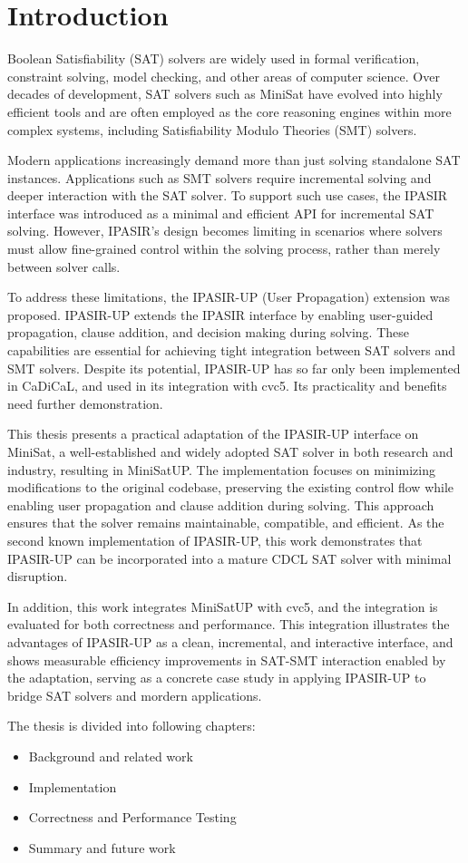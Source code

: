 \chapter{Introduction}

Boolean Satisfiability (SAT) solvers are widely used in formal verification, constraint solving, model checking, and other areas of computer science. Over decades of development, SAT solvers such as MiniSat have evolved into highly efficient tools and are often employed as the core reasoning engines within more complex systems, including Satisfiability Modulo Theories (SMT) solvers.

Modern applications increasingly demand more than just solving standalone SAT instances. Applications such as SMT solvers require incremental solving and deeper interaction with the SAT solver. To support such use cases, the IPASIR interface was introduced as a minimal and efficient API for incremental SAT solving. However, IPASIR's design becomes limiting in scenarios where solvers must allow fine-grained control within the solving process, rather than merely between solver calls.

To address these limitations, the IPASIR-UP (User Propagation) extension was proposed. IPASIR-UP extends the IPASIR interface by enabling user-guided propagation, clause addition, and decision making during solving. These capabilities are essential for achieving tight integration between SAT solvers and SMT solvers. Despite its potential, IPASIR-UP has so far only been implemented in CaDiCaL, and used in its integration with cvc5. Its practicality and benefits need further demonstration.

This thesis presents a practical adaptation of the IPASIR-UP interface on MiniSat, a well-established and widely adopted SAT solver in both research and industry, resulting in MiniSatUP. The implementation focuses on minimizing modifications to the original codebase, preserving the existing control flow while enabling user propagation and clause addition during solving. This approach ensures that the solver remains maintainable, compatible, and efficient. As the second known implementation of IPASIR-UP, this work demonstrates that IPASIR-UP can be incorporated into a mature CDCL SAT solver with minimal disruption.

In addition, this work integrates MiniSatUP with cvc5, and the integration is evaluated for both correctness and performance. This integration illustrates the advantages of IPASIR-UP as a clean, incremental, and interactive interface, and shows measurable efficiency improvements in SAT-SMT interaction enabled by the adaptation, serving as a concrete case study in applying IPASIR-UP to bridge SAT solvers and mordern applications.

The thesis is divided into following chapters:

\begin{itemize}
  \item Background and related work
  \item Implementation
  \item Correctness and Performance Testing
  \item Summary and future work
\end{itemize}

